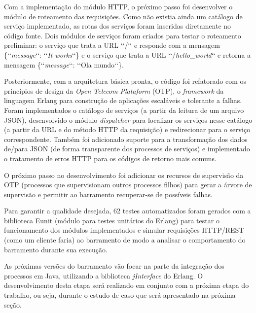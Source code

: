 Com a implementação do módulo HTTP, o próximo 
passo foi desenvolver o módulo de roteamento das requisições. Como não existia ainda um catálogo de serviço implementado, as rotas dos serviços 
foram inseridas diretamente no código fonte. Dois módulos de serviços foram criados 
para testar o roteamento preliminar: o serviço que trata a URL ‘‘/‘‘ e responde com a 
mensagem \{‘‘\textit{message}‘‘: ‘‘\textit{It works}‘‘\} e o serviço que trata 
a URL ‘‘/\textit{hello}\_\textit{world}‘‘ e retorna a 
mensagem \{‘‘\textit{message}‘‘: ‘‘Ola mundo‘‘\}.

Posteriormente, com a arquitetura básica pronta, o código foi refatorado com os princípios de design da \textit{Open Telecom Plataform} (OTP), 
o \textit{framework} da linguagem Erlang para construção de aplicações escaláveis e tolerante a falhas. Foram implementados o catálogo de serviços (a partir da leitura de um arquivo JSON), desenvolvido o módulo \textit{dispatcher} para localizar os serviços nesse catálogo (a partir da URL e do método HTTP da requisição) e redirecionar para o serviço correspondente. Também foi adicionado suporte para a transformação 
dos dados de/para JSON (de forma transparente dos processos de serviços) e 
implementado o tratamento de erros HTTP para os códigos de retorno mais comuns.

O próximo passo no desenvolvimento foi adicionar os recursos de supervisão da OTP 
(processos que supervisionam outros processos filhos) para gerar a árvore de supervisão 
e permitir ao barramento recuperar-se de possíveis falhas.

Para garantir a qualidade desejada, 62 testes automatizados foram gerados com a biblioteca Eunit (módulo para testes unitários do Erlang) para testar o funcionamento dos módulos implementados e simular requisições HTTP/REST (como um cliente faria) ao barramento de modo a analisar o comportamento do barramento durante sua execução.

As próximas versões do barramento vão focar na parte da integração dos processos em Java, utilizando a biblioteca \textit{jInterface} do Erlang. O desenvolvimento desta etapa será realizado em conjunto com a próxima etapa do trabalho, ou seja, durante o estudo de caso que será apresentado na próxima seção.


